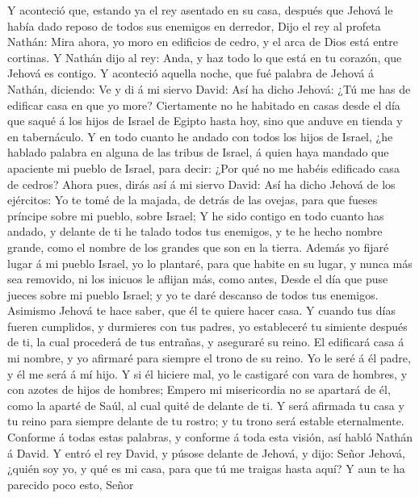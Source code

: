  Y aconteció que, estando ya el rey asentado en su casa,
después que Jehová le había dado reposo de todos sus enemigos en
derredor,  Dijo el rey al profeta Nathán: Mira ahora, yo
moro en edificios de cedro, y el arca de Dios está entre cortinas.
 Y Nathán dijo al rey: Anda, y haz todo lo que está en tu
corazón, que Jehová es contigo.  Y aconteció aquella noche,
que fué palabra de Jehová á Nathán, diciendo:  Ve y di á mi
siervo David: Así ha dicho Jehová: ¿Tú me has de edificar casa en que yo
more?  Ciertamente no he habitado en casas desde el día que
saqué á los hijos de Israel de Egipto hasta hoy, sino que anduve en
tienda y en tabernáculo.  Y en todo cuanto he andado con
todos los hijos de Israel, ¿he hablado palabra en alguna de las tribus
de Israel, á quien haya mandado que apaciente mi pueblo de Israel, para
decir: ¿Por qué no me habéis edificado casa de cedros? 
Ahora pues, dirás así á mi siervo David: Así ha dicho Jehová de los
ejércitos: Yo te tomé de la majada, de detrás de las ovejas, para que
fueses príncipe sobre mi pueblo, sobre Israel;  Y he sido
contigo en todo cuanto has andado, y delante de ti he talado todos tus
enemigos, y te he hecho nombre grande, como el nombre de los grandes que
son en la tierra.  Además yo fijaré lugar á mi pueblo
Israel, yo lo plantaré, para que habite en su lugar, y nunca más sea
removido, ni los inicuos le aflijan más, como antes,  Desde
el día que puse jueces sobre mi pueblo Israel; y yo te daré descanso de
todos tus enemigos. Asimismo Jehová te hace saber, que él te quiere
hacer casa.  Y cuando tus días fueren cumplidos, y
durmieres con tus padres, yo estableceré tu simiente después de ti, la
cual procederá de tus entrañas, y aseguraré su reino.  El
edificará casa á mi nombre, y yo afirmaré para siempre el trono de su
reino.  Yo le seré á él padre, y él me será á mí hijo. Y si
él hiciere mal, yo le castigaré con vara de hombres, y con azotes de
hijos de hombres;  Empero mi misericordia no se apartará de
él, como la aparté de Saúl, al cual quité de delante de ti.
 Y será afirmada tu casa y tu reino para siempre delante de
tu rostro; y tu trono será estable eternalmente.  Conforme
á todas estas palabras, y conforme á toda esta visión, así habló Nathán
á David.  Y entró el rey David, y púsose delante de Jehová,
y dijo: Señor Jehová, ¿quién soy yo, y qué es mi casa, para que tú me
traigas hasta aquí?  Y aun te ha parecido poco esto, Señor
